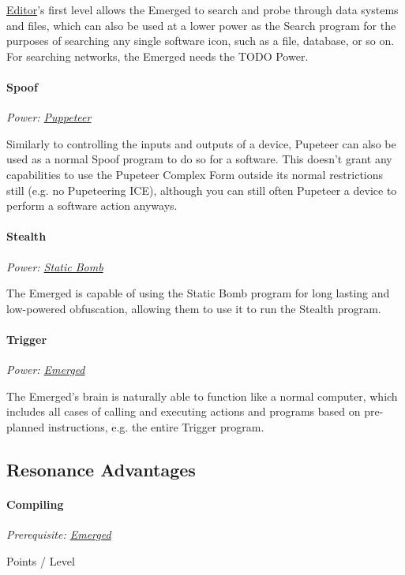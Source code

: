 \begin{multicols*}{3}
	\hyperref[editor]{Editor}'s first level allows the Emerged to search and probe through data systems and files, which can also be used at a lower power as the Search program for the purposes of searching any single software icon, such as a file, database, or so on. For searching networks, the Emerged needs the TODO Power.
	
	\paragraph{Spoof}
	\begin{center}
		\textit{Power: \hyperref[puppeteer]{Puppeteer}}
	\end{center}


	Similarly to controlling the inputs and outputs of a device, Pupeteer can also be used as a normal Spoof program to do so for a software. This doesn't grant any capabilities to use the Pupeteer Complex Form outside its normal restrictions still (e.g. no Pupeteering ICE), although you can still often Pupeteer a device to perform a software action anyways.

	\paragraph{Stealth}
	\begin{center}
	\textit{Power: \hyperref[static_bomb]{Static Bomb}}
	\end{center}
	
	The Emerged is capable of using the Static Bomb program for long lasting and low-powered obfuscation, allowing them to use it to run the Stealth program.
	
	\paragraph{Trigger}
	\begin{center}
	\textit{Power: \hyperref[emerged]{Emerged}}
	\end{center}

	The Emerged's brain is naturally able to function like a normal computer, which includes all cases of calling and executing actions and programs based on pre-planned instructions, e.g. the entire Trigger program.

	\subsection{Resonance Advantages}
	
	\paragraph{Compiling}\label{compiling}
	\textit{Prerequisite: \hyperref[emerged]{Emerged}}
	\begin{flushright}
		 Points / Level
	\end{flushright}


\end{multicols*}
